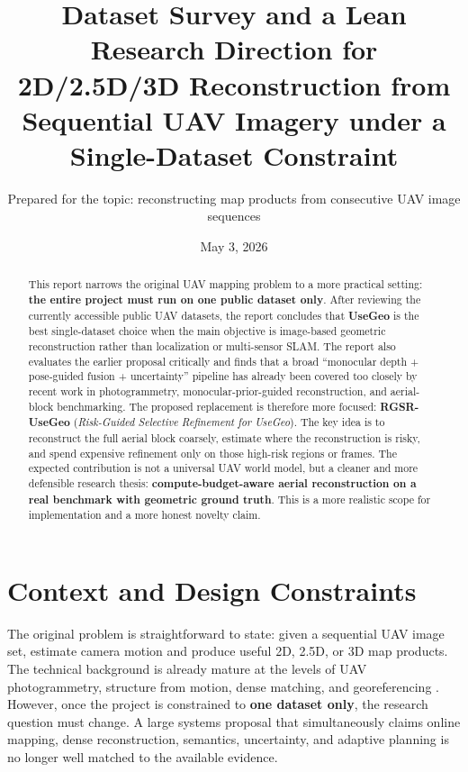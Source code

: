 \documentclass[11pt,a4paper]{article}
\title{Dataset Survey and a Lean Research Direction for 2D/2.5D/3D Reconstruction from Sequential UAV Imagery under a Single-Dataset Constraint}
\author{Prepared for the topic: reconstructing map products from consecutive UAV image sequences}
\date{May 3, 2026}
\begin{document}
\maketitle

\begin{abstract}
This report narrows the original UAV mapping problem to a more practical setting: \textbf{the entire project must run on one public dataset only}. After reviewing the currently accessible public UAV datasets, the report concludes that \textbf{UseGeo} is the best single-dataset choice when the main objective is image-based geometric reconstruction rather than localization or multi-sensor SLAM. The report also evaluates the earlier proposal critically and finds that a broad ``monocular depth + pose-guided fusion + uncertainty'' pipeline has already been covered too closely by recent work in photogrammetry, monocular-prior-guided reconstruction, and aerial-block benchmarking. The proposed replacement is therefore more focused: \textbf{RGSR-UseGeo} (\textit{Risk-Guided Selective Refinement for UseGeo}). The key idea is to reconstruct the full aerial block coarsely, estimate where the reconstruction is risky, and spend expensive refinement only on those high-risk regions or frames. The expected contribution is not a universal UAV world model, but a cleaner and more defensible research thesis: \textbf{compute-budget-aware aerial reconstruction on a real benchmark with geometric ground truth}. This is a more realistic scope for implementation and a more honest novelty claim.
\end{abstract}

\section{Context and Design Constraints}

The original problem is straightforward to state: given a sequential UAV image set, estimate camera motion and produce useful 2D, 2.5D, or 3D map products. The technical background is already mature at the levels of UAV photogrammetry, structure from motion, dense matching, and georeferencing \citep{Colomina2014Unmanned,Zhao2014Direct,Jiang2017Efficient,Jiang2020Efficient}. However, once the project is constrained to \textbf{one dataset only}, the research question must change. A large systems proposal that simultaneously claims online mapping, dense reconstruction, semantics, uncertainty, and adaptive planning is no longer well matched to the available evidence.
\end{document}

